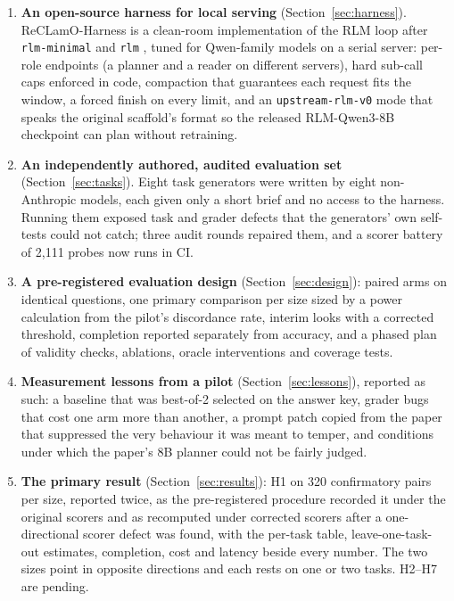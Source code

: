 \documentclass[11pt]{article}
\newcommand{\code}[1]{\texttt{#1}}
\begin{document}
\begin{enumerate}[leftmargin=*]
\item \textbf{An open-source harness for local serving}
  (Section~\ref{sec:harness}). ReCLamO-Harness \citep{reclamo} is a clean-room
  implementation of the RLM loop after \code{rlm-minimal} and \code{rlm}
  \citep{rlmminimal,rlmrepo}, tuned for Qwen-family models on a serial server:
  per-role endpoints (a planner and a reader on different servers), hard sub-call
  caps enforced in code, compaction that guarantees each request fits the window,
  a forced finish on every limit, and an \code{upstream-rlm-v0} mode that speaks
  the original scaffold's format so the released RLM-Qwen3-8B checkpoint
  \citep{rlmqwen8b} can plan without retraining.
\item \textbf{An independently authored, audited evaluation set}
  (Section~\ref{sec:tasks}). Eight task generators were written by eight
  non-Anthropic models, each given only a short brief and no access to the
  harness. Running them exposed task and grader defects that the generators' own
  self-tests could not catch; three audit rounds repaired them, and a scorer
  battery of 2,111 probes now runs in CI.
\item \textbf{A pre-registered evaluation design} (Section~\ref{sec:design}): paired
  arms on identical questions, one primary comparison per size sized by a power
  calculation from the pilot's discordance rate, interim looks with a corrected
  threshold, completion reported separately from accuracy, and a phased plan of
  validity checks, ablations, oracle interventions and coverage tests.
\item \textbf{Measurement lessons from a pilot} (Section~\ref{sec:lessons}),
  reported as such: a baseline that was best-of-2 selected on the answer key, grader
  bugs that cost one arm more than another, a prompt patch copied from the paper
  that suppressed the very behaviour it was meant to temper, and conditions under
  which the paper's 8B planner could not be fairly judged.
\item \textbf{The primary result} (Section~\ref{sec:results}): H1 on 320 confirmatory
  pairs per size, reported twice, as the pre-registered procedure recorded it under the
  original scorers and as recomputed under corrected scorers after a one-directional
  scorer defect was found, with the per-task table, leave-one-task-out estimates,
  completion, cost and latency beside every number. The two sizes point in opposite
  directions and each rests on one or two tasks. H2--H7 are pending.
\end{enumerate}
\end{document}
